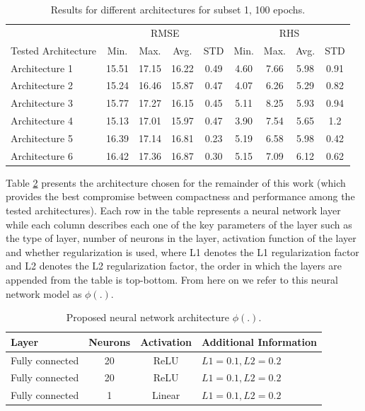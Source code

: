 \documentclass[preprint,12pt]{elsarticle}%
\begin{document}
\begin{table}[H]
\begin{center}
\begin{tabular}
[c]{l|cccc|cccc}\hline & \multicolumn{4}{|c}{RMSE} & \multicolumn{4}{|c}{RHS}\\
Tested Architecture & Min. & Max. & Avg. & STD & Min. & Max. & Avg. & STD\\\hline
Architecture 1 & 15.51 & 17.15 & 16.22 & 0.49 & 4.60 & 7.66 & 5.98 & 0.91\\
Architecture 2 & 15.24 & 16.46 & 15.87 & 0.47 & 4.07 & 6.26 & 5.29 & 0.82\\
Architecture 3 & 15.77 & 17.27 & 16.15 & 0.45 & 5.11 & 8.25 & 5.93 & 0.94\\
Architecture 4 & 15.13 & 17.01 & 15.97 & 0.47 & 3.90 & 7.54 & 5.65 & 1.2\\
Architecture 5 & 16.39 & 17.14 & 16.81 & 0.23 & 5.19 & 6.58 & 5.98 & 0.42\\
Architecture 6 & 16.42 & 17.36 & 16.87 & 0.30 & 5.15 & 7.09 & 6.12 & 0.62\\\hline
\end{tabular}
\caption{Results for different architectures for subset 1, 100 epochs.}
\label{table:tested_architectures_100}
\end{center}
\end{table}

Table \ref{table:proposed_nn} presents the architecture chosen for the remainder of this work (which provides the best compromise between compactness and performance among the tested architectures). Each row in the table represents a neural network layer while each column describes each one of the key parameters of the layer such as the type of layer, number of neurons in the layer, activation function of the layer and whether regularization is used, where L1 denotes the L1 regularization factor and L2 denotes the L2 regularization factor, the order in which the layers are appended from the table is top-bottom. From here on we refer to this neural network model as $\phi(.)$.

\begin{table}[H]
\begin{center}
\begin{tabular}
[c]{llll}\hline
Layer & Neurons & Activation & Additional Information\\\hline
Fully connected & \multicolumn{1}{c}{20} & \multicolumn{1}{c}{ReLU} &
$L1=0.1,L2=0.2$\\
Fully connected & \multicolumn{1}{c}{20} & \multicolumn{1}{c}{ReLU} &
$L1=0.1,L2=0.2$\\
Fully connected & \multicolumn{1}{c}{1} & \multicolumn{1}{c}{Linear} &
$L1=0.1,L2=0.2$\\\hline
\end{tabular}
\caption{Proposed neural network architecture $\phi(.)$.}
\label{table:proposed_nn}
\end{center}
\end{table}
\end{document}
